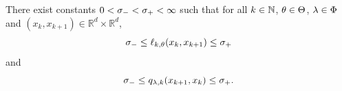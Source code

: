 \documentclass{article}
\begin{document}

\begin{hypH}
\label{assum:strong:mixing}
There exist constants $0 < \sigma_- < \sigma_+ < \infty$ such that for all $k \in \mathbb{N}$, $\theta\in\Theta$, $\lambda\in\Phi$ and $(x_k, x_{k + 1}) \in \mathbb{R}^d \times \mathbb{R}^d$, 
$$
    \sigma_- \leq \ell_{k,\theta}(x_k, x_{k + 1}) \leq \sigma_+
$$ 
and 
$$
    \sigma_- \leq  q_{\lambda,k}(x_{k+1}, x_{k}) \leq \sigma_+. 
$$ 
\end{hypH}
\end{document}
